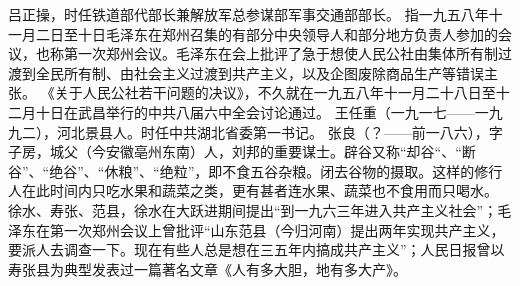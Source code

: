 \begin{maonote}
吕正操，时任铁道部代部长兼解放军总参谋部军事交通部部长。
指一九五八年十一月二日至十日毛泽东在郑州召集的有部分中央领导人和部分地方负责人参加的会议，也称第一次郑州会议。毛泽东在会上批评了急于想使人民公社由集体所有制过渡到全民所有制、由社会主义过渡到共产主义，以及企图废除商品生产等错误主张。
《关于人民公社若干问题的决议》，不久就在一九五八年十一月二十八日至十二月十日在武昌举行的中共八届六中全会讨论通过。
王任重（一九一七——一九九二），河北景县人。时任中共湖北省委第一书记。
张良（？——前一八六），字子房，城父（今安徽亳州东南）人，刘邦的重要谋士。辟谷又称“却谷“、“断谷”、“绝谷”、“休粮”、“绝粒”，即不食五谷杂粮。闭去谷物的摄取。这样的修行人在此时间内只吃水果和蔬菜之类，更有甚者连水果、蔬菜也不食用而只喝水。
徐水、寿张、范县，徐水在大跃进期间提出“到一九六三年进入共产主义社会”；毛泽东在第一次郑州会议上曾批评“山东范县（今归河南）提出两年实现共产主义，要派人去调查一下。现在有些人总是想在三五年内搞成共产主义”；人民日报曾以寿张县为典型发表过一篇著名文章《人有多大胆，地有多大产》。
\end{maonote}
